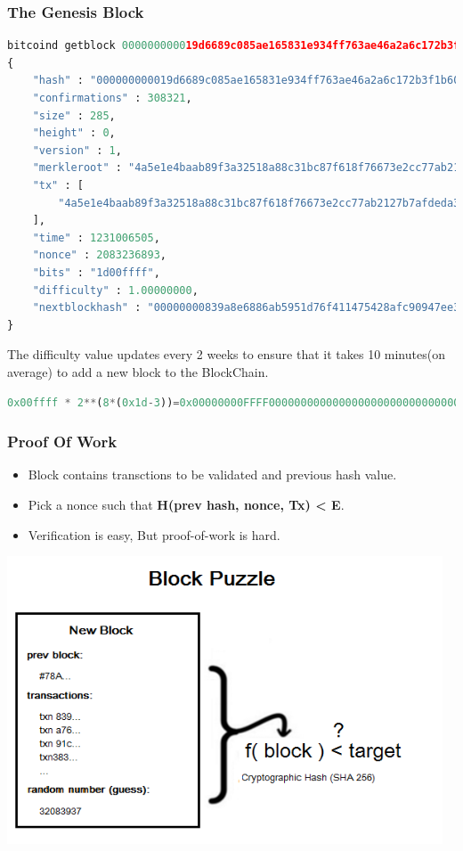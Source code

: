 \begin{frame}[fragile]
    \frametitle{The Genesis Block}
    \begin{lstlisting}[language=Python]
bitcoind getblock 000000000019d6689c085ae165831e934ff763ae46a2a6c172b3f1b60a8ce26f
{
    "hash" : "000000000019d6689c085ae165831e934ff763ae46a2a6c172b3f1b60a8ce26f",
    "confirmations" : 308321,
    "size" : 285,
    "height" : 0,
    "version" : 1,
    "merkleroot" : "4a5e1e4baab89f3a32518a88c31bc87f618f76673e2cc77ab2127b7afdeda33b",
    "tx" : [
        "4a5e1e4baab89f3a32518a88c31bc87f618f76673e2cc77ab2127b7afdeda33b"
    ],
    "time" : 1231006505,
    "nonce" : 2083236893,
    "bits" : "1d00ffff",
    "difficulty" : 1.00000000,
    "nextblockhash" : "00000000839a8e6886ab5951d76f411475428afc90947ee320161bbf18eb6048"
}
    \end{lstlisting}
    The difficulty value updates every 2 weeks to ensure that it takes 10 minutes(on average) to add a new block to the BlockChain.
    \begin{lstlisting}[language=Python]
0x00ffff * 2**(8*(0x1d-3))=0x00000000FFFF0000000000000000000000000000000000000000000000000000 \end{lstlisting}
\end{frame}

\begin{frame}[fragile]
    \frametitle{Proof Of Work}
    \begin{itemize}
        \item Block contains transctions to be validated and previous hash value.
        \item Pick a nonce such that \textbf{H(prev hash, nonce, Tx) < E}.
        \item Verification is easy, But proof-of-work is hard.
    \end{itemize}
    \includegraphics[scale=0.5]{./figures/block-puzzle.png}
\end{frame}

